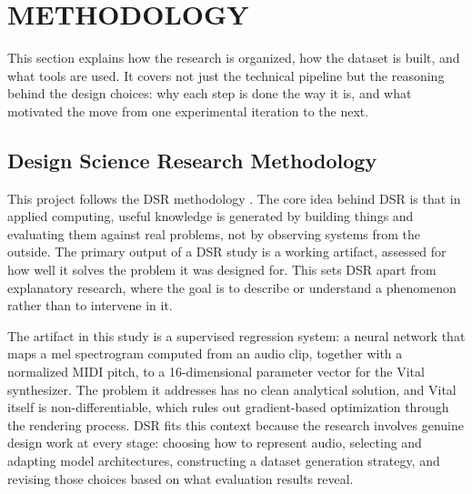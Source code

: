 
\section{METHODOLOGY}
\label{sec:methodology}

\noindent
This section explains how the research is organized, how the dataset is built, and what tools are used. It covers not just the technical pipeline but the reasoning behind the design choices: why each step is done the way it is, and what motivated the move from one experimental iteration to the next.

\subsection{Design Science Research Methodology}

\noindent
This project follows the DSR methodology \cite{wieringa2014design}. The core idea behind DSR is that in applied computing, useful knowledge is generated by building things and evaluating them against real problems, not by observing systems from the outside. The primary output of a DSR study is a working artifact, assessed for how well it solves the problem it was designed for. This sets DSR apart from explanatory research, where the goal is to describe or understand a phenomenon rather than to intervene in it.

\par \vspace{0.3cm}
\noindent
The artifact in this study is a supervised regression system: a neural network that maps a mel spectrogram computed from an audio clip, together with a normalized MIDI pitch, to a 16-dimensional parameter vector for the Vital synthesizer. The problem it addresses has no clean analytical solution, and Vital itself is non-differentiable, which rules out gradient-based optimization through the rendering process. DSR fits this context because the research involves genuine design work at every stage: choosing how to represent audio, selecting and adapting model architectures, constructing a dataset generation strategy, and revising those choices based on what evaluation results reveal.

